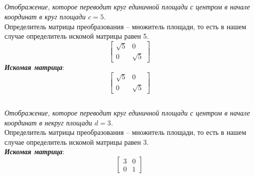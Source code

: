 \documentclass[a5paper, 10pt]{article}
\theoremstyle{definition}
\theoremstyle{plain}
\theoremstyle{remark}
\begin{document}
\subsection{}
\textit{Отображение, которое переводит круг единичной площади с центром в начале координат в круг площади $c=5$.}\\
Определитель матрицы преобразования -- множитель площади, то есть в нашем случае определитель искомой матрицы равен 5. \\
\begin{equation}
\begin{bmatrix}
\sqrt{5} & 0\\
0 & \sqrt{5}
\end{bmatrix}
\end{equation}
\textit{\textbf{Искомая матрица}}:
\begin{equation}
\begin{bmatrix}
\sqrt{5} & 0\\
0 & \sqrt{5}
\end{bmatrix}
\end{equation}

\subsection{}
\textit{Отображение, которое переводит круг единичной площади с центром в начале координат в некруг площади $d=3$.}\\
Определитель матрицы преобразования -- множитель площади, то есть в нашем случае определитель искомой матрицы равен 3. \\
\textit{\textbf{Искомая матрица}}:
\begin{equation}
\begin{bmatrix}
3 & 0\\
0 & 1
\end{bmatrix}
\end{equation}
\end{document}

